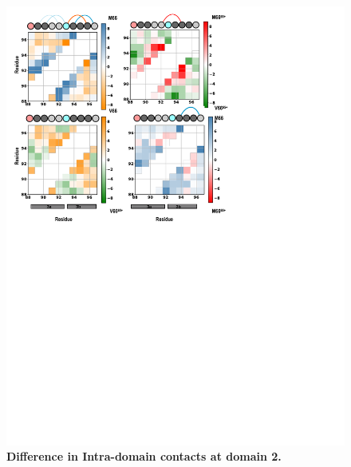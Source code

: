 \documentclass[journal=jacsat,manuscript=article]{achemso}
\begin{document}
\begin{figure}[!ht]
\includegraphics[scale=0.5,width=12cm,trim={0 0cm 0 0cm},clip]{../figures/3a_3b.pdf}
\caption{{\bf Difference in Intra-domain contacts at domain 2.}
 }
\label{fig6}
\end{figure}

\clearpage
\end{document}
